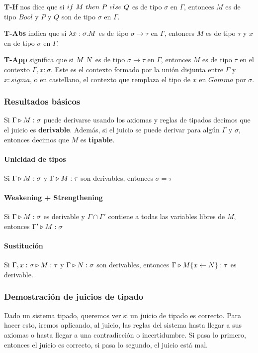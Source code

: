 \vspace*{5mm}
\textbf{T-If} nos dice que si $if~ M~ then~ P~ else~ Q$ es de tipo $\sigma$ en $\Gamma$, entonces $M$ es de tipo $Bool$ y $P$ y $Q$ son de tipo $\sigma$ en $\Gamma$.

\textbf{T-Abs} indica que si $\lambda x: \sigma . M$ es de tipo $\sigma\to\tau$ en $\Gamma$, entonces $M$ es de tipo $\tau$ y $x$ en de tipo $\sigma$ en $\Gamma$.

\textbf{T-App} significa que si $M~N$ es de tipo $\sigma\to\tau$ en $\Gamma$, entonces $M$ es de tipo $\tau$ en el contexto $\Gamma, x:\sigma$. Este es el contexto formado por la unión disjunta entre $\Gamma$ y $x:sigma$, o en castellano, el contexto que remplaza el tipo de $x$ en $Gamma$ por $\sigma$.

\subsubsection{Resultados básicos}

Si $\Gamma\triangleright M : \sigma$ puede derivarse usando los axiomas y reglas de tipados decimos que el juicio es \textbf{derivable}. Además, si el juicio se puede derivar para algún $\Gamma$ y $\sigma$, entonces decimos que $M$ es \textbf{tipable}.

\paragraph{Unicidad de tipos} Si $\Gamma\triangleright M : \sigma$ y $\Gamma\triangleright M : \tau$ son derivables, entonces $\sigma = \tau$

\paragraph{Weakening + Strengthening} Si $\Gamma\triangleright M : \sigma$ es derivable y $\Gamma\cap\Gamma'$ contiene a todas las variables libres de $M$, entonces $\Gamma'\triangleright M : \sigma$

\paragraph{Sustitución} Si $\Gamma,x:\sigma\triangleright M : \tau$ y $\Gamma\triangleright N : \sigma$ son derivables, entonces $\Gamma\triangleright M\{x\leftarrow N\} : \tau$ es derivable.

\subsubsection{Demostración de juicios de tipado}
Dado un sistema tipado, queremos ver si un juicio de tipado es correcto. Para hacer esto, iremos aplicando, al juicio, las reglas del sistema hasta llegar a sus axiomas o hasta llegar a una contradicción o incertidumbre. Si pasa lo primero, entonces el juicio es correcto, si pasa lo segundo, el juicio está mal.

